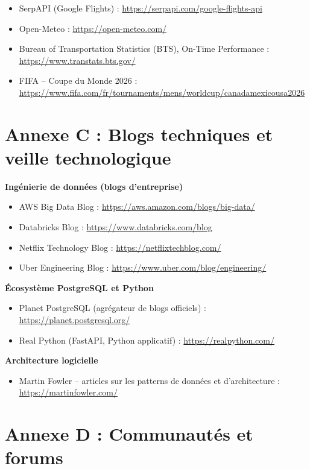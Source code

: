 \documentclass[11pt,a4paper]{report}
\begin{document}
\begin{itemize}
  \item SerpAPI (Google Flights) : \url{https://serpapi.com/google-flights-api}
  \item Open-Meteo : \url{https://open-meteo.com/}
  \item Bureau of Transportation Statistics (BTS), On-Time Performance : \url{https://www.transtats.bts.gov/}
  \item FIFA -- Coupe du Monde 2026 : \url{https://www.fifa.com/fr/tournaments/mens/worldcup/canadamexicousa2026}
\end{itemize}

\section*{Annexe C : Blogs techniques et veille technologique}

\textbf{Ingénierie de données (blogs d'entreprise)}
\begin{itemize}
  \item AWS Big Data Blog : \url{https://aws.amazon.com/blogs/big-data/}
  \item Databricks Blog : \url{https://www.databricks.com/blog}
  \item Netflix Technology Blog : \url{https://netflixtechblog.com/}
  \item Uber Engineering Blog : \url{https://www.uber.com/blog/engineering/}
\end{itemize}

\textbf{Écosystème PostgreSQL et Python}
\begin{itemize}
  \item Planet PostgreSQL (agrégateur de blogs officiels) : \url{https://planet.postgresql.org/}
  \item Real Python (FastAPI, Python applicatif) : \url{https://realpython.com/}
\end{itemize}

\textbf{Architecture logicielle}
\begin{itemize}
  \item Martin Fowler -- articles sur les patterns de données et d'architecture : \url{https://martinfowler.com/}
\end{itemize}

\section*{Annexe D : Communautés et forums}
\end{document}
